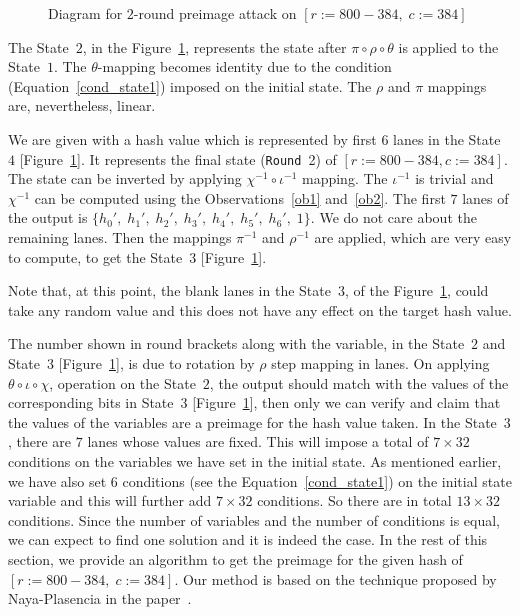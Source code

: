 \begin{figure}[!t]
\begin{center}
{
}
\caption{Diagram for $2$-round preimage attack on \KECCAK{}$[r:=800-384,\; c:=384]$ \label{atk}}
\end{center}
\end{figure}
The State~$2$, in the Figure~\ref{atk}, represents the state after $\pi \circ \rho \circ \theta$ is applied to the State~$1$. 
The $\theta$-mapping becomes identity due to the condition
(Equation~\ref{cond_state1}) imposed on the initial state. 
The $\rho$ and $\pi$ mappings are, nevertheless, linear.

We are given with a hash value which is represented by first $6$ lanes in the State~$4$ [Figure~\ref{atk}]. It represents the final state ({\tt Round}~2) of \KECCAK{}$[r:=800-384, c:=384]$. The state can be inverted by applying $\chi^{-1} \circ \iota^{-1}$ mapping. The $\iota^{-1}$ is trivial and $\chi^{-1}$ can be computed using the Observations~\ref{ob1} and~\ref{ob2}. The first $7$ lanes of the output is $\{h_0',\;h_1',\;h_2',\;h_3',\;h_4',\;h_5',\;h_6',\;1\}$. We do not care about the remaining  lanes. 
Then the mappings $\pi^{-1}$ and $\rho^{-1}$ are applied, which are very easy to compute, to get the State~$3$ [Figure~\ref{atk}]. 

Note that, at this point, the blank lanes in the State~$3$, of the Figure~\ref{atk}, could take any random value and this does not have any effect on the target hash value.

The number shown in round brackets along with the variable, in the State~$2$ and State~$3$ [Figure~\ref{atk}], is due to rotation by $\rho$ step mapping in lanes.
On applying $\theta \circ \iota \circ \chi$, operation on the State~$2$, the output should match with the values of the corresponding bits in State~$3$ [Figure~\ref{atk}], then only we can verify and claim that the values of the variables are a preimage for the hash value taken. In the State~$3$, there are $7$ lanes whose values are fixed. 
This will impose a total of $7\times 32$ conditions on the variables we have set in the initial state. As mentioned earlier, we have also set $6$ conditions (see the Equation~\ref{cond_state1}) on the initial state variable and this will further add $7 \times 32$ conditions. So there are in total $13\times 32$ conditions. Since the number of variables and the number of conditions is equal, we can expect to find one solution and it is indeed the case. In the rest of this section, we provide an algorithm to get the preimage for the given hash of  \KECCAK{}$[r:=800-384,\;c:=384]$. Our method is based on the technique proposed by Naya-Plasencia \etal in the paper~\cite{naya2011practical}.

